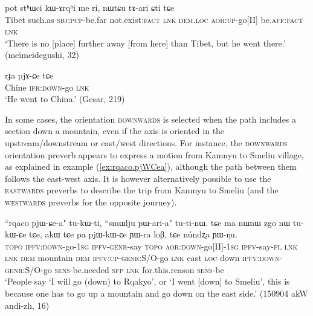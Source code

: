 \begin{exe}
\ex \label{ex:pot.tari}
\gll  pot stʰɯci kɯ-ɤrqʰi me ri, nɯtɕu tɤ-ari ɕti tɕe \\
Tibet such.as \textsc{sbj}:\textsc{pcp}-be.far not.exist:\textsc{fact} \textsc{lnk} \textsc{dem}.\textsc{loc} \textsc{aor}:\textsc{up}-go[II] be.\textsc{aff}:\textsc{fact} \textsc{lnk} \\
\glt `There is no [place] further away [from here] than Tibet, but he went there.' (meimeidegushi, 32)
\end{exe}

\begin{exe}
\ex \label{ex:rJa.pjACe}
\gll rɟa pjɤ-ɕe tɕe \\
Chine \textsc{ifr}:\textsc{down}-go \textsc{lnk} \\
\glt `He went to China.' (Gesar, 219) 
\end{exe}

In some cases, the orientation \textsc{downwards} is selected when the path includes a section down a mountain, even if the axis is oriented in the upstream/downstream or east/west directions. For instance, the \textsc{downwards} orientation preverb appears to express a motion from  Kamnyu to   Smeliu village, as explained in example (\ref{ex:rqaco.pjWCea}), although the path between them follows the east-west axis. It is however alternatively possible to use the \textsc{eastwards} preverbs to describe the trip from Kamnyu to Smeliu (and the \textsc{westwards} preverbs for the opposite journey).

 \begin{exe}
\ex \label{ex:rqaco.pjWCea}
\gll ``rqaco pjɯ-ɕe-a" tu-kɯ-ti, ``smɯlju pɯ-ari-a" tu-ti-nɯ. tɕe ma nɯnɯ zgo nɯ tu-kɯ-ɕe tɕe, akɯ tɕe pa pjɯ-kɯ-ɕe ɲɯ-ra loβ, tɕe núndʐa ɲɯ-ŋu. \\
\textsc{topo} \textsc{ipfv}:\textsc{down}-go-\textsc{1sg} \textsc{ipfv}-\textsc{genr}-say  \textsc{topo} \textsc{aor}:\textsc{down}-go[II]-\textsc{1sg} \textsc{ipfv}-say-\textsc{pl} \textsc{lnk} \textsc{lnk} \textsc{dem} mountain \textsc{dem} \textsc{ipfv}:\textsc{up}-\textsc{genr}:S/O-go \textsc{lnk} east \textsc{loc} down \textsc{ipfv}:\textsc{down}-\textsc{genr}:S/O-go \textsc{sens}-be.needed \textsc{sfp} \textsc{lnk} for.this.reason \textsc{sens}-be \\
\glt `People say `I will go (down) to Rqakyo', or `I went [down] to Smeliu', this is because one has to go up a mountain and go down on the east side.' (150904 akW andi-zh, 16)
\end{exe}

